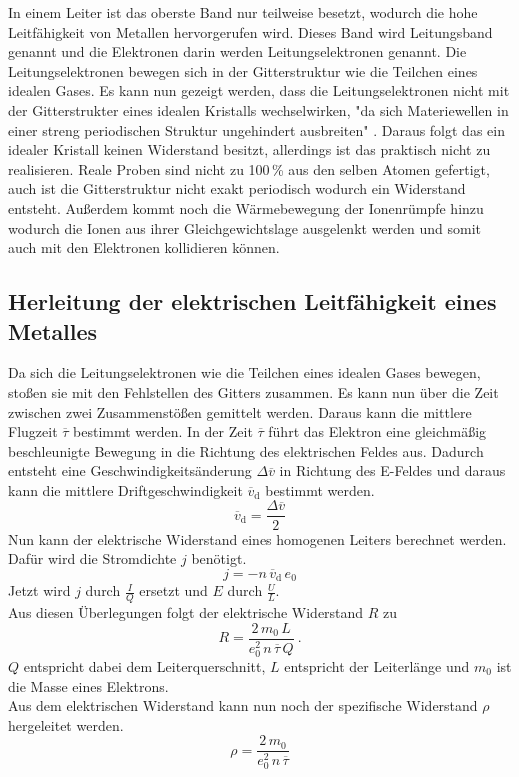 In einem Leiter ist das oberste Band nur teilweise besetzt, wodurch die hohe Leitfähigkeit von Metallen hervorgerufen wird. Dieses Band wird Leitungsband genannt und die Elektronen darin werden Leitungselektronen genannt. Die Leitungselektronen bewegen sich in der Gitterstruktur wie die Teilchen eines idealen Gases. Es kann nun gezeigt werden, dass die Leitungselektronen nicht mit der Gitterstrukter eines idealen Kristalls wechselwirken, "da sich Materiewellen in einer streng periodischen Struktur ungehindert ausbreiten" \cite[2]{sample}. Daraus folgt das ein idealer Kristall keinen Widerstand besitzt, allerdings ist das praktisch nicht zu realisieren. Reale Proben sind nicht zu 100\,\% aus den selben Atomen gefertigt, auch ist die Gitterstruktur nicht exakt periodisch wodurch ein Widerstand entsteht. Außerdem kommt noch die Wärmebewegung der Ionenrümpfe hinzu wodurch die Ionen aus ihrer Gleichgewichtslage ausgelenkt werden und somit auch mit den Elektronen kollidieren können.


\subsection{Herleitung der elektrischen Leitfähigkeit eines Metalles}
Da sich die Leitungselektronen wie die Teilchen eines idealen Gases bewegen, stoßen sie mit den Fehlstellen des Gitters zusammen. Es kann nun über die Zeit zwischen zwei Zusammenstößen gemittelt werden. Daraus kann die mittlere Flugzeit $\overline{\tau}$ bestimmt werden. In der Zeit $\overline{\tau}$ führt das Elektron eine gleichmäßig beschleunigte Bewegung in die Richtung des elektrischen Feldes aus. Dadurch entsteht eine Geschwindigkeitsänderung $\Delta\overline{v}$ in Richtung des E-Feldes und daraus kann die mittlere Driftgeschwindigkeit $\overline{v}_\text{d}$ bestimmt werden.
\begin{equation}
	\overline{v}_\text{d} = \frac{\Delta\overline{v}}{2}
\end{equation}
Nun kann der elektrische Widerstand eines homogenen Leiters berechnet werden. Dafür wird die Stromdichte $j$ benötigt.
\begin{equation}
	j = -n\,\overline{v}_\text{d}\,e_0
	\label{eqn:j}
\end{equation}
Jetzt wird $j$ durch $\frac{I}{Q}$ ersetzt und $E$ durch $\frac{U}{L}$. \\
Aus diesen Überlegungen folgt der elektrische Widerstand $R$ zu
\begin{equation}
	R = \frac{2\,m_0\,L}{e_0^2\,n\,\overline{\tau}\,Q} \ .
	\label{eqn:R}
\end{equation}
$Q$ entspricht dabei dem Leiterquerschnitt, $L$ entspricht der Leiterlänge und $m_0$ ist die Masse eines Elektrons. \\
Aus dem elektrischen Widerstand kann nun noch der spezifische Widerstand $\rho$ hergeleitet werden.
\begin{equation}
	\rho = \frac{2\,m_0}{e_0^2\,n\,\overline{\tau}}
\end{equation}


